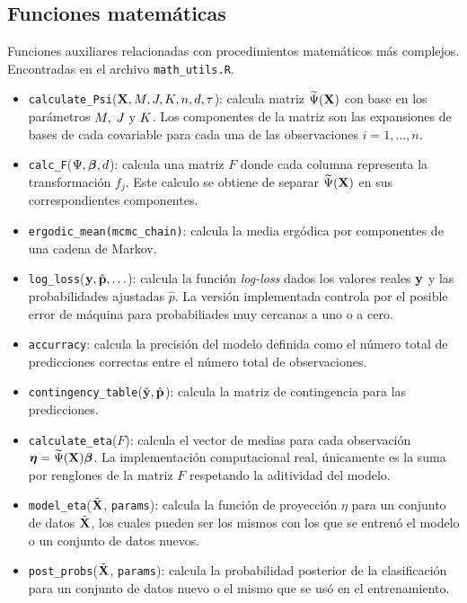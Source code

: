 \documentclass[../../Main/Main.tex]{subfiles}
\begin{document}
\subsection*{Funciones matemáticas}
Funciones auxiliares relacionadas con procedimientos matemáticos más complejos. Encontradas en el archivo \verb|math_utils.R|.
\begin{itemize}[label = {}]
	\item \verb|calculate_Psi|($\mathbf{X},M,J,K,n,d,\tau$): calcula matriz $\widetilde{\Psi}(\mathbf{X})$ con base en los parámetros $M,\;J\text{ y }K$. Los componentes de la matriz son las expansiones de bases de cada covariable para cada una de las observaciones $i=1,\ldots,n$.
	\item \verb|calc_F|($\Psi, \bm{\beta}, d$): calcula una matriz $F$ donde cada columna representa la transformación $f_j$. Este calculo se obtiene de separar $\widetilde{\Psi}(\mathbf{X})$ en sus correspondientes componentes.
	\item \verb|ergodic_mean(mcmc_chain)|: calcula la media ergódica por componentes de una cadena de Markov.
	\item \verb|log_loss|($\mathbf{y},\hat{\mathbf{p}},\ldots $): calcula la función \textit{log-loss} dados los valores reales $\mathbf{y}$ y las probabilidades ajustadas $\hat{p}$. La versión implementada controla por el posible error de máquina para probabiliades muy cercanas a uno o a cero.
	\item \verb|accurracy|: calcula la precisión del modelo definida como el número total de predicciones correctas entre el número total de observaciones.
	\item \verb|contingency_table|($\tilde{\mathbf{y}},\hat{\mathbf{p}}$): calcula la matriz de contingencia para las predicciones. 
	\item \verb|calculate_eta|($F$): calcula el vector de medias para cada observación $\bm{\eta} = \widetilde{\Psi}(\mathbf{X})\bm{\beta}$. La implementación computacional real, únicamente es la suma por renglones de la matriz $F$ respetando la aditividad del modelo.
	\item \verb|model_eta|($\tilde{\mathbf{X}}$, \verb|params|): calcula la función de proyección $\eta$ para un conjunto de datos $\tilde{\mathbf{X}}$, los cuales pueden ser los mismos con los que se entrenó el modelo o un conjunto de datos nuevos.
	\item \verb|post_probs|($\tilde{\mathbf{X}}$, \verb|params|): calcula la probabilidad posterior de la clasificación para un conjunto de datos nuevo o el mismo que se usó en el entrenamiento. 
\end{itemize}
\end{document}
